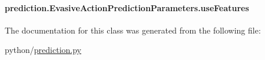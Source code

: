\hypertarget{classprediction_1_1EvasiveActionPredictionParameters_a998ff692327907d9b5f368fc5e3d906a}{
\paragraph[{use\-Features}]{\setlength{\rightskip}{0pt plus 5cm}prediction.\-Evasive\-Action\-Prediction\-Parameters.\-use\-Features}}\label{classprediction_1_1EvasiveActionPredictionParameters_a998ff692327907d9b5f368fc5e3d906a}


The documentation for this class was generated from the following file\-:\begin{DoxyCompactItemize}
\item 
python/\hyperlink{prediction_8py}{prediction.\-py}\end{DoxyCompactItemize}
